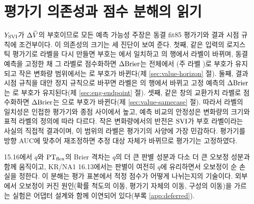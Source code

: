 \section{평가기 의존성과 점수 분해의 읽기}
\label{sec:disc-evaluator}

$Y_{\mathrm{SVI}}$가 $\Delta\widehat V$의 부호이므로 모든 예측 가능성 주장은 동결 fit85 평가기와 결과 시점 규칙에 조건부이다. 이 의존성의 크기는 세 진단이 보여 준다. 첫째, 같은 입력의 로지스틱 평가기로 라벨을 다시 만들면 부호는 \peerSignAgree{}에서 일치하고 \peerFlipAll{}의 행에서 라벨이 바뀌며, 동결 예측을 고정한 채 그 라벨로 점수화하면 $\Delta\mathrm{Brier}$는 전체에서 \peerAllDbAlt{}(주 라벨 \peerAllDbMain{})로 부호가 유지되고 작은 변화량 범위에서는 \peerSmallDbAlt{}로 부호가 바뀐다(제 \ref{sec:value-horizon} 절). 둘째, 결과 시점 규칙을 대안 정지 규칙으로 바꾸면 라벨은 \efFlip{}의 행에서 바뀌고 고정 예측의 $\Delta\mathrm{Brier}$는 \efDbFixed{}로 부호가 유지된다(제 \ref{sec:eng-endpoint} 절). 셋째, 같은 창의 교환가치 라벨로 점수화하면 $\Delta\mathrm{Brier}$는 \meDbMarket{}으로 부호가 바뀐다(제 \ref{sec:value-samecase} 절). 따라서 라벨의 일치성은 인접한 평가기와 종점 사이에서 높고, 예측 비교의 안정성은 변화량의 크기와 표적 라벨의 정의에 따라 다르다. 작은 변화량에서의 반전은 $\mathrm{SVI}$가 부호 라벨이라는 사실의 직접적 결과이며, 이 범위의 라벨은 평가기의 사양에 가장 민감하다. 평가기를 방향 AUC에 맞추어 재조정하면 추정 대상 자체가 바뀌므로 평가기는 고정하였다.

15.16에서 $q$와 $\mathrm{PT}_{\mathrm{flex}}$의 Brier 격차는 $q$의 더 큰 판별 성분과 다소 더 큰 오보정 성분과 함께 움직이고, KR/NA1 16.13에서는 판별이 여전히 $q$에 유리하면서 오보정이 순 손실을 정한다. 이 분해는 평가 표본에서 적정 점수가 어떻게 나뉘는지의 기술이다. 외부에서 오보정이 커진 원인(확률 척도의 이동, 평가기 자체의 이동, 구성의 이동)을 가르는 실험은 어댑터 설계와 함께 이연되어 있다(부록 \ref{app:deferred}).
